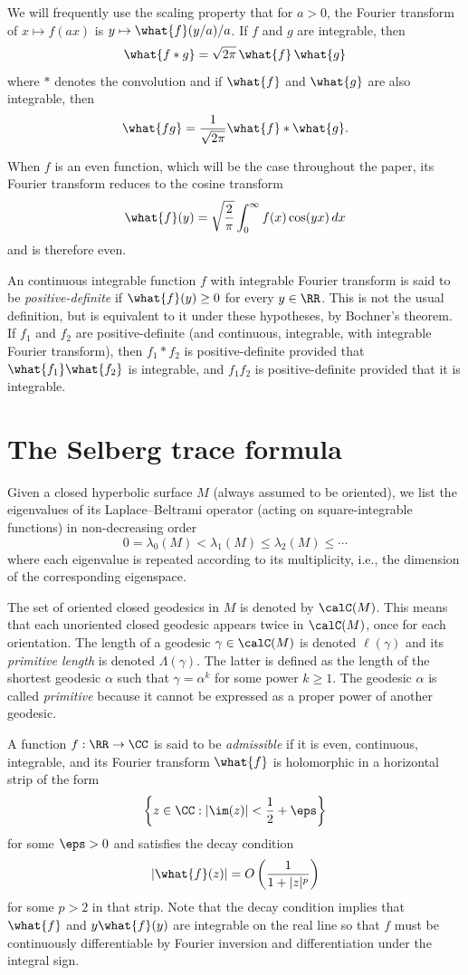 \documentclass[12pt]{amsart}
\numberwithin{equation}{section}
\begin{document}
We will frequently use the scaling property that for $a>0$, the Fourier transform of $x \mapsto f(ax)$ is $y \mapsto \what{f}(y/a)/a$. If $f$ and $g$ are integrable, then 
\[
\what{f\ast g} =\sqrt{2\pi} \, \what{f} \, \what{g}
\]
where $\ast$ denotes the convolution and if $\what{f}$ and $\what{g}$ are also integrable, then
\[
\what{fg} = \frac{1}{\sqrt{2\pi}}\what{f} \ast \what{g}.
\]

When $f$ is an even function, which will be the case throughout the paper, its Fourier transform reduces to the cosine transform
\[
\what{f}(y) = \sqrt{\frac{2}{\pi}}\int_{0}^\infty f(x)\cos(yx) \,dx
\]
and is therefore even.

An continuous integrable function $f$ with integrable Fourier transform is said to be \emph{positive-definite} if $\what{f}(y) \geq 0$ for every $y \in \RR$. This is not the usual definition, but is equivalent to it under these hypotheses, by Bochner's theorem. If $f_1$ and $f_2$ are positive-definite (and continuous, integrable, with integrable Fourier transform), then $f_1 \ast f_2$ is positive-definite provided that $\what{f_1}\what{f_2}$ is integrable, and $f_1f_2$ is positive-definite provided that it is integrable.


\section{The Selberg trace formula}

Given a closed hyperbolic surface $M$  (always assumed to be oriented), we list the eigenvalues of its Laplace--Beltrami operator (acting on square-integrable functions) in non-decreasing order 
\[
0 = \lambda_0(M)<\lambda_1(M)\leq \lambda_2(M) \leq \cdots
\]
where each eigenvalue is repeated according to its multiplicity, i.e., the dimension of the corresponding eigenspace.

The set of oriented closed geodesics in $M$ is denoted by $\calC(M)$. This means that each unoriented closed geodesic appears twice in $\calC(M)$, once for each orientation. The length of a geodesic $\gamma \in \calC(M)$ is denoted $\ell(\gamma)$ and its \emph{primitive length} is denoted $\Lambda(\gamma)$. The latter is defined as the length of the shortest geodesic $\alpha$ such that $\gamma=\alpha^k$ for some power $k\geq 1$. The geodesic $\alpha$ is called \emph{primitive} because it cannot be expressed as a proper power of another geodesic.

A function $f:\RR \to \CC$ is said to be \emph{admissible} if it is even, continuous, integrable, and its Fourier transform $\what{f}$ is holomorphic in a horizontal strip of the form 
\[
\left\{ z \in \CC :| \im(z)| < \frac12+\eps \right\}
\] 
for some $\eps>0$ and satisfies the decay condition
\[
|\what{f}(z)| = O\left( \frac{1}{1+|z|^p} \right)
\]
for some $p>2$ in that strip. Note that the decay condition implies that $\what{f}$ and $y\what{f}(y)$ are integrable on the real line so that $f$ must be continuously differentiable by Fourier inversion and differentiation under the integral sign.
\end{document}
